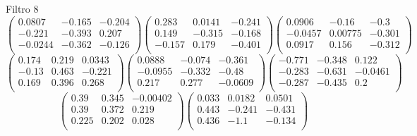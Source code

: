 Filtro 8
{ \small
\[
\begin{pmatrix}
  0.0807 & -0.165 & -0.204 \\
  -0.221 & -0.393 & 0.207 \\
  -0.0244 & -0.362 & -0.126 \\
\end{pmatrix}
\begin{pmatrix}
  0.283 & 0.0141 & -0.241 \\
  0.149 & -0.315 & -0.168 \\
  -0.157 & 0.179 & -0.401 \\
\end{pmatrix}
\begin{pmatrix}
  0.0906 & -0.16 & -0.3 \\
  -0.0457 & 0.00775 & -0.301 \\
  0.0917 & 0.156 & -0.312 \\
\end{pmatrix}
\]
\[
\begin{pmatrix}
  0.174 & 0.219 & 0.0343 \\
  -0.13 & 0.463 & -0.221 \\
  0.169 & 0.396 & 0.268 \\
\end{pmatrix}
\begin{pmatrix}
  0.0888 & -0.074 & -0.361 \\
  -0.0955 & -0.332 & -0.48 \\
  0.217 & 0.277 & -0.0609 \\
\end{pmatrix}
\begin{pmatrix}
  -0.771 & -0.348 & 0.122 \\
  -0.283 & -0.631 & -0.0461 \\
  -0.287 & -0.435 & 0.2 \\
\end{pmatrix}
\]
\[
\begin{pmatrix}
  0.39 & 0.345 & -0.00402 \\
  0.39 & 0.372 & 0.219 \\
  0.225 & 0.202 & 0.028 \\
\end{pmatrix}
\begin{pmatrix}
  0.033 & 0.0182 & 0.0501 \\
  0.443 & -0.241 & -0.431 \\
  0.436 & -1.1 & -0.134 \\
\end{pmatrix}
\]
}

